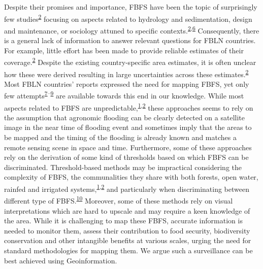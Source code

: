 \documentclass[12pt,oneside]{article}
\begin{document}
Despite their promises and importance, FBFS have been the topic of
surprisingly few
studies\textsuperscript{\protect\hyperlink{ref-VanSteenbergen_et_al_2010}{2}}
focusing on aspects related to hydrology and sedimentation, design and
maintenance, or sociology attuned to specific
contexts.\textsuperscript{\protect\hyperlink{ref-VanSteenbergen_et_al_2010}{2},\protect\hyperlink{ref-Haile_2010}{6}}
Consequently, there is a general lack of information to answer relevant
questions for FBLN countries. For example, little effort has been made
to provide reliable estimates of their
coverage.\textsuperscript{\protect\hyperlink{ref-VanSteenbergen_et_al_2010}{2}}
Despite the existing country-specific area estimates, it is often
unclear how these were derived resulting in large uncertainties across
these
estimates.\textsuperscript{\protect\hyperlink{ref-VanSteenbergen_et_al_2010}{2}}
Most FBLN countries' reports expressed the need for mapping FBFS, yet
only few
attempts\textsuperscript{\protect\hyperlink{ref-Ghebreamlak_et_al_2018}{7}--\protect\hyperlink{ref-Theilen-Willige_et_al_2015}{9}}
are available towards this end in our knowledge. While most aspects
related to FBFS are
unpredictable,\textsuperscript{\protect\hyperlink{ref-Puertas_et_al_2011}{1},\protect\hyperlink{ref-VanSteenbergen_et_al_2010}{2}}
these approaches seems to rely on the assumption that agronomic flooding
can be clearly detected on a satellite image in the near time of
flooding event and sometimes imply that the areas to be mapped and the
timing of the flooding is already known and matches a remote sensing
scene in space and time. Furthermore, some of these approaches rely on
the derivation of some kind of thresholds based on which FBFS can be
discriminated. Threshold-based methods may be impractical considering
the complexity of FBFS, the communalities they share with both forests,
open water, rainfed and irrigated
systems,\textsuperscript{\protect\hyperlink{ref-Puertas_et_al_2011}{1},\protect\hyperlink{ref-VanSteenbergen_et_al_2010}{2}}
and particularly when discriminating between different type of
FBFS.\textsuperscript{\protect\hyperlink{ref-Boschetti_et_al_2014}{10}}
Moreover, some of these methods rely on visual interpretations which are
hard to upscale and may require a keen knowledge of the area. While it
is challenging to map these FBFS, accurate information is needed to
monitor them, assess their contribution to food security, biodiversity
conservation and other intangible benefits at various scales, urging the
need for standard methodologies for mapping them. We argue such a
surveillance can be best achieved using Geoinformation.
\end{document}
